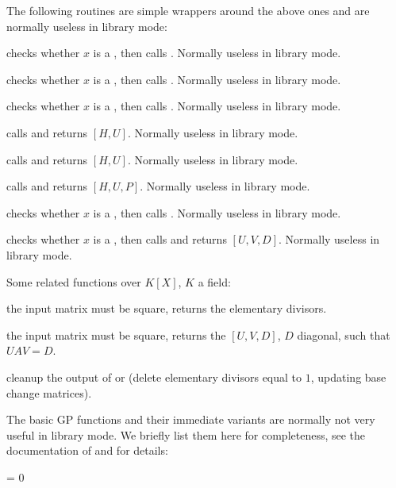 The following routines are simple wrappers around the above ones and are
normally useless in library mode:

 checks whether $x$ is a , then calls .
Normally useless in library mode.

 checks whether $x$ is a , then calls
. Normally useless in library mode.

 checks whether $x$ is a , then calls
. Normally useless in library mode.

 calls
 and returns $[H, U]$. Normally useless in library
mode.

 calls  and returns $[H,
U]$. Normally useless in library mode.

 calls  and returns
$[H, U, P]$. Normally useless in library mode.

 checks whether $x$ is a , then calls
. Normally useless in library mode.

 checks whether $x$ is a , then calls
 and returns $[U,V,D]$. Normally useless in
library mode.

\noindent Some related functions over $K[X]$, $K$ a field:

 the input matrix must be square, returns the
elementary divisors.

 the input matrix must be square, returns the
$[U,V,D]$, $D$ diagonal, such that $UAV = D$.

 cleanup the output of  or
 (delete elementary divisors equal to $1$, updating base
change matrices).


The basic GP functions and their immediate variants are normally not very
useful in library mode. We briefly list them here for completeness, see the
documentation of  and  for details:

\item {}

 \fl = 0

